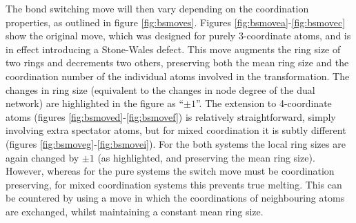 The bond switching move will then vary depending on the coordination properties, as outlined in figure \ref{fig:bsmoves}.
Figures \ref{fig:bsmovea}\--\ref{fig:bsmovec} show the original move, which was designed for purely 3\--coordinate atoms, and is in effect introducing a Stone\--Wales defect.
This move augments the ring size of two rings and decrements two others, preserving both the mean ring size and the coordination number of the individual atoms involved in the transformation.
The changes in ring size (equivalent to the changes in node degree of the dual network) are highlighted in the figure as ``$\pm{1}$''.
The extension to 4\--coordinate atoms (figures \ref{fig:bsmoved}\--\ref{fig:bsmovef}) is relatively straightforward, simply involving extra spectator atoms, but for mixed coordination it is subtly different (figures \ref{fig:bsmoveg}\--\ref{fig:bsmovei}).
For the both systems the local ring sizes are again changed by $\pm{1}$ (as highlighted, and preserving the mean ring size).
However, whereas for the pure systems the switch move must be coordination preserving, for mixed coordination systems this prevents true melting.
This can be countered by using a move in which the coordinations of neighbouring atoms are exchanged, whilst maintaining a constant mean ring size.

